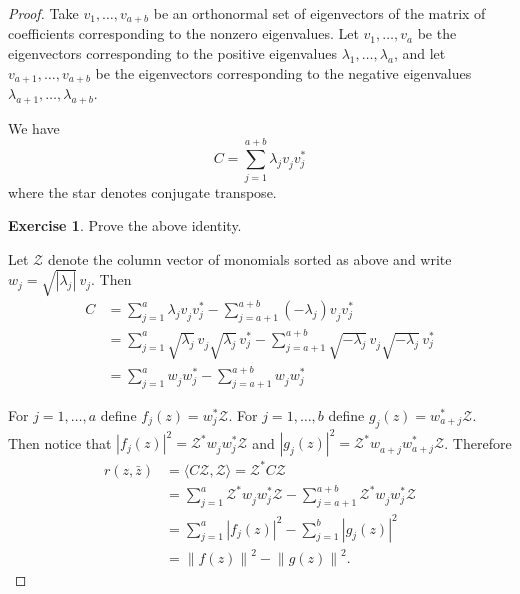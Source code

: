 \documentclass[12pt,openany]{book}
\newcommand{\abs}[1]{\left\lvert {#1} \right\rvert}
\newcommand{\norm}[1]{\left\lVert {#1} \right\rVert}
\newcommand{\sZ}{{\mathcal{Z}}}
\theoremstyle{plain}
\theoremstyle{remark}
\theoremstyle{definition}
\theoremstyle{exercise}
\newtheorem{exercise}{Exercise}[section]
\theoremstyle{example}
\begin{document}
\begin{proof}
Take $v_1,\ldots,v_{a+b}$ be an orthonormal set of eigenvectors of
the matrix of coefficients corresponding
to the nonzero eigenvalues.
Let $v_1,\ldots,v_a$ be the eigenvectors corresponding to
the positive eigenvalues $\lambda_1,\ldots,\lambda_a$,
and let $v_{a+1},\ldots,v_{a+b}$ be the eigenvectors corresponding to
the negative eigenvalues $\lambda_{a+1},\ldots,\lambda_{a+b}$.

We have
\begin{equation}
C = \sum_{j=1}^{a+b} \lambda_j v_j^{} v_j^* 
\end{equation}
where the star denotes conjugate transpose.

\begin{exercise}
Prove the above identity.
\end{exercise}

Let $\sZ$ denote the column vector of monomials sorted as above
and write $w_j = \sqrt{\abs{\lambda_j}}\, v_j$.
Then
\begin{equation}
\begin{split}
C & = \sum_{j=1}^a \lambda_j v_j^{} v_j^* - \sum_{j=a+1}^{a+b} (-\lambda_j) v_j^{} v_j^* 
\\
& = \sum_{j=1}^a \sqrt{\lambda_j}\, v_j^{} \sqrt{\lambda_j}\, v_j^*
- \sum_{j=a+1}^{a+b} \sqrt{-\lambda_j}\, v_j^{} \sqrt{-\lambda_j}\, v_j^* 
\\
& = \sum_{j=1}^a w_j^{} w_j^*
- \sum_{j=a+1}^{a+b} w_j^{} w_j^* 
\end{split}
\end{equation}

For $j=1,\ldots,a$ define $f_j(z) = w_j^* \sZ$.
For $j=1,\ldots,b$ define $g_j(z) = w_{a+j}^* \sZ$.
Then notice that $\abs{f_j(z)}^2 =
\sZ^* w_j^{} w_j^* \sZ$ and
$\abs{g_j(z)}^2 =
\sZ^* w_{a+j}^{} w_{a+j}^* \sZ$.  Therefore
\begin{equation}
\begin{split}
r(z,\bar{z}) &= \langle C \sZ , \sZ \rangle = \sZ^* C \sZ \\
& =
\sum_{j=1}^a \sZ^* w_j^{} w_j^* \sZ - \sum_{j=a+1}^{a+b} \sZ^* w_j^{} w_j^* \sZ
\\
& = 
\sum_{j=1}^a \abs{f_j(z)}^2 - \sum_{j=1}^{b} \abs{g_j(z)}^2 \\
& =
\norm{f(z)}^2 - \norm{g(z)}^2 .
\end{split}
\end{equation}
\end{proof}
\end{document}
